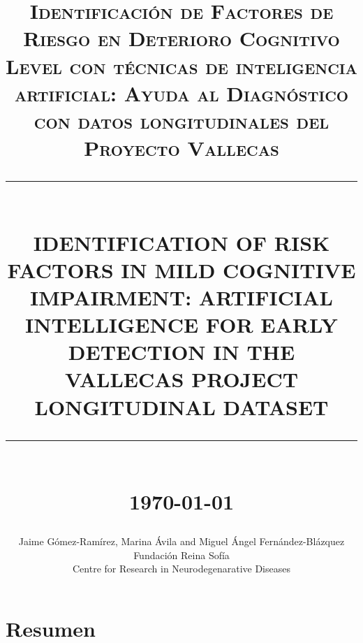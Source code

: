 \documentclass[11pt]{article}
\newcommand{\HRule}[1]{\rule{\linewidth}{#1}}
\begin{document}

\title{ \normalsize \textsc{Identificación de Factores de Riesgo en Deterioro Cognitivo Level con técnicas de inteligencia artificial: Ayuda al Diagnóstico con datos longitudinales del Proyecto Vallecas}
		\\ [2.0cm]
		\HRule{0.5pt} \\
		\LARGE \textbf{\uppercase{Identification of risk factors in Mild Cognitive Impairment: Artificial intelligence   for early detection in The Vallecas Project longitudinal dataset}}
		\HRule{2pt} \\ [0.5cm]
		\normalsize \today \vspace*{5\baselineskip}}

\date{}

\author{
		Jaime G\'omez-Ram\'irez, Marina \'Avila and Miguel \'Angel Fern\'andez-Bl\'azquez   \\
		Fundaci\'on Reina Sof\'ia \\
		Centre for Research in Neurodegenarative Diseases }

\maketitle
\tableofcontents
\newpage

\sectionfont{\scshape}



\section*{Resumen}
\end{document}
